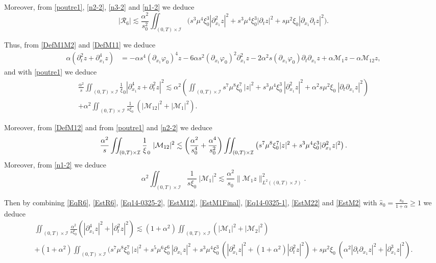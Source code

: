 \documentclass[a4paper, 12pt]{article}
\theoremstyle{plain}
\theoremstyle{definition}
\numberwithin{theorem}{section}
\numberwithin{equation}{section}
\begin{document}
{Moreover, from \eqref{poutre1}, \eqref{n2-2}, \eqref{n3-2} and \eqref{n1-2} we deduce
\begin{equation}\label{EstR6}
\left|\mathcal{R}_6\right|\lesssim \frac{\alpha^2}{s_0^2}\iint_{(0,T)\times\mathcal{I}}\big(s^3\mu^4\xi_0^3|\partial^2_{x_1}z|^2                                                                                         +s^3\mu^4\xi_0^3|\partial_tz|^2+s\mu^2\xi_0|\partial_{x_1}\partial_t z|^2\big).
\end{equation}

Thus, from \eqref{DefM1M2} and \eqref{DefM11} we deduce
\begin{align*}
\alpha(\partial^2_tz+\partial^4_{x_1}z)&=-\alpha s^4(\partial_{x_1}\varphi_0)^4z-6\alpha s^2(\partial_{x_1}\varphi_0)^2\partial^2_{x_1}z-2\alpha^2 s(\partial_{x_1}\varphi_0)\partial_t\partial_{x_1}z+\alpha \mathcal{M}_1z-\alpha \mathcal{M}_{12}z,
\end{align*}
and with \eqref{poutre1} we deduce
\begin{multline}\label{Eq14-0325-2}
\frac{\alpha^2}{s}\iint_{(0,T)\times\mathcal{I}}\frac1\xi_0|\partial^4_{x_1}z+\partial^2_tz|^2\lesssim \alpha^2\left(\iint_{(0,T)\times\mathcal{I}} s^7\mu^8\xi_0^7~|z|^2+ s^3\mu^4\xi_0^3~|\partial^2_{x_1}z|^2+\alpha^2 s\mu^2\xi_0~|\partial_t\partial_{x_1}z|^2\right)\\
+ \alpha^2\iint_{(0,T)\times\mathcal{I}}\frac{1}{s\xi_0}~(|\mathcal{M}_{12}|^2+|\mathcal{M}_{1}|^2).
\end{multline}


Moreover, from \eqref{DefM12} and from \eqref{poutre1} and \eqref{n2-2} we deduce
\begin{equation}\label{EstM12}
\frac{\alpha^2}{s}\iint_{(0,T)\times\mathcal{I}}\frac1\xi_0~|\mathcal{M}_{12}|^2\\
\lesssim \left(\frac{\alpha^2}{s_0^4}+\frac{\alpha^4}{s_0^2}\right)\iint_{(0,T)\times\mathcal{I}}\left(s^7\mu^8\xi^7_0|z|^2+s^3\mu^4\xi_0^3|\partial^2_{x_1}z|^2\right).
\end{equation}
Moreover, from \eqref{n1-2} we deduce
\begin{equation}\label{EstM1Final}
\alpha^2\iint_{(0,T)\times\mathcal{I}}\frac{1}{s\xi_0}~|\mathcal{M}_{1}|^2\lesssim \frac{\alpha^2}{s_0}\|\mathcal{M}_1z\|^2_{L^2((0,T)\times\mathcal{I})}.
\end{equation}

Then by combining  \eqref{EqR6}, \eqref{EstR6}, \eqref{Eq14-0325-2},  \eqref{EstM12}, \eqref{EstM1Final}, \eqref{Eq14-0325-1}, \eqref{EstM22} and \eqref{EstM2} with $\widehat{s}_0=\frac{s_0}{1+\alpha}\geq 1$ we deduce
\begin{multline*}
\iint_{(0,T)\times\mathcal{I}}\frac{\alpha^2}{s\xi_0}(|\partial^4_{x_1}z|^2+|\partial^2_tz|^2)\lesssim (1+\alpha^2)\iint_{(0,T)\times\mathcal{I}}(|\mathcal{M}_{1}|^2+|\mathcal{M}_{2}|^2)\\
+ (1+\alpha^2)\iint_{(0,T)\times\mathcal{I}} (s^7\mu^8\xi_0^7~|z|^2+s^5\mu^6\xi_0^6~|\partial_{x_1}z|^2+s^3\mu^4\xi_0^3~(|\partial^2_{x_1}z|^2+(1+\alpha^2)|\partial^2_{t}z|^2)+s\mu^2\xi_0~(\alpha^2|\partial_t\partial_{x_1}z|^2+|\partial_{x_1}^3z|^2).
\end{multline*}

}
\end{document}
